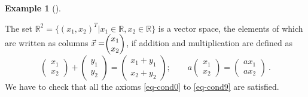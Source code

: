 \documentclass[
  a4paper,
  DIV=11,
  numbers=noendperiod,
  oneside]{scrreprt}
\theoremstyle{definition}
\newtheorem{example}{Example}[chapter]
\theoremstyle{remark}
\begin{document}
\begin{example}[]\protect\hypertarget{exm-vktspace1}{}\label{exm-vktspace1}

The set
\(\mathbb{R}^2 = \{(x_{1},x_{2})^T \vert x_{1} \in \mathbb{R}, x_{2} \in \mathbb{R}\}\)
is a vector space, the elements of which are written as columns
\(\vec{x}=\scriptstyle \begin{pmatrix}   x_{1}\\x_{2}  \end{pmatrix} \textstyle\),
if addition and multiplication are defined as
\[ \begin{pmatrix}   x_1 \\ x_2  \end{pmatrix} 
  +
   \begin{pmatrix}   y_1 \\ y_2  \end{pmatrix} 
  =
   \begin{pmatrix}   x_1+y_1 \\ x_2+y_2  \end{pmatrix} ;
  \qquad
  a 
   \begin{pmatrix}   x_1 \\ x_2  \end{pmatrix} 
  =
   \begin{pmatrix}   a x_1 \\  a x_2  \end{pmatrix}  \ .\] We have to
check that all the axioms \ref{eq-cond0} to \ref{eq-cond9} are
satisfied.


\end{example}
\end{document}
